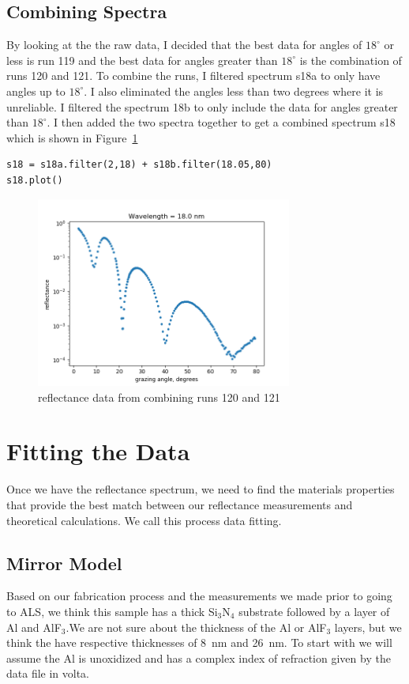 \documentclass[english]{scrartcl}
\begin{document}
\subsection{Combining Spectra}
By looking at the the raw data, I
decided that the best data for angles of $18^\circ$ or less is run 119 and the best
data for angles greater than $18^\circ$ is the combination of runs 120 and 121.
To combine the runs, I filtered spectrum s18a to only have angles up to $18^\circ$.
I also eliminated the angles less than two degrees where it is unreliable. I
filtered the spectrum 18b to only include the data for angles greater than
$18^\circ$. I then added the two spectra together to get a combined spectrum s18
which is shown in Figure~\ref{fig:18}
\begin{lstlisting}
s18 = s18a.filter(2,18) + s18b.filter(18.05,80)
s18.plot()
\end{lstlisting}
\begin{figure}[htb]
  \begin{center}
    \includegraphics[width=0.75\textwidth]{images/r18}
  \end{center}
  \caption{\label{fig:18}reflectance data from combining runs 120 and 121}
\end{figure}

\section{Fitting the Data}
Once we have the reflectance spectrum, we need to find the materials properties
that provide the best match between our reflectance measurements and theoretical
calculations. We call this process data fitting.

\subsection{Mirror Model}
Based on our fabrication process and the measurements we made prior to
going to ALS, we think this sample has a thick Si$_3$N$_4$ substrate followed
by a layer of Al and AlF$_3$.We are not sure about the thickness of the Al or
AlF$_3$ layers, but we think the have respective thicknesses of 8~nm and 26~nm. To
start with we will assume the Al is unoxidized and has a complex index of
refraction given by the data file in volta.
\end{document}
